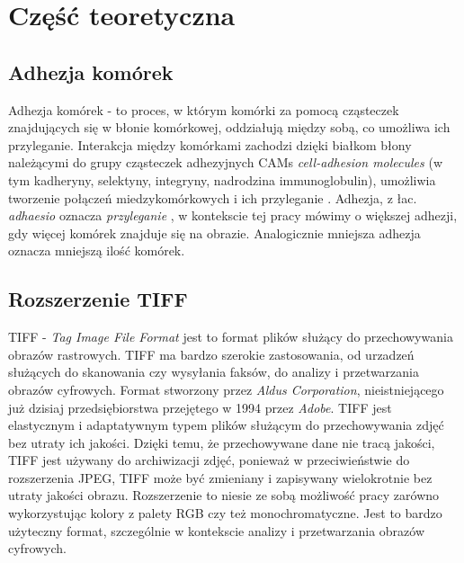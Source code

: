\documentclass{article}
\begin{document}
    \newpage
    \section{Część teoretyczna}
        \subsection{Adhezja komórek}
        {
            \label{sec:adhezja-komorek}
            \Large
            \justifying
            \quad
            Adhezja komórek - to proces, w którym komórki za pomocą cząsteczek znajdujących się w błonie komórkowej, oddziałują między sobą, co umożliwa ich przyleganie.
            Interakcja między komórkami zachodzi dzięki białkom błony należącymi do grupy cząsteczek adhezyjnych CAMs \textit{cell-adhesion molecules} (w tym kadheryny, selektyny, integryny, nadrodzina immunoglobulin), umożliwia tworzenie połączeń miedzykomórkowych i ich przyleganie
            \cite{Molecular Biology of the Cell. 4th edition}.
            Adhezja, z łac. \textit {adhaesio} oznacza \textit{przyleganie} \cite{adhezja}, w kontekscie tej pracy mówimy o większej adhezji, gdy więcej komórek znajduje się na obrazie.
            Analogicznie mniejsza adhezja oznacza mniejszą ilość komórek.
        }
        \subsection{Rozszerzenie TIFF}
        {
            \label{sec:rozszerzenie-tiff}
            \Large
            \justifying
            \quad
            TIFF - \textit{Tag Image File Format} jest to format plików służący do przechowywania obrazów rastrowych.
            TIFF ma bardzo szerokie zastosowania, od urzadzeń służących do skanowania czy wysyłania faksów, do analizy i przetwarzania obrazów cyfrowych.
            Format stworzony przez \textit{Aldus Corporation}, nieistniejącego już dzisiaj przedsiębiorstwa przejętego w 1994 przez \textit{Adobe}.
            TIFF jest elastycznym i adaptatywnym typem plików służącym do przechowywania zdjęć bez utraty ich jakości.
            Dzięki temu, że przechowywane dane nie tracą jakości, TIFF jest używany do archiwizacji zdjęć, ponieważ w przeciwieństwie do rozszerzenia JPEG,
            TIFF może być zmieniany i zapisywany wielokrotnie bez utraty jakości obrazu.
            Rozszerzenie to niesie ze sobą możliwość pracy zarówno wykorzystując kolory z palety RGB czy też monochromatyczne.
            Jest to bardzo użyteczny format, szczególnie w kontekscie analizy i przetwarzania obrazów cyfrowych. \cite{Encyclopedia of Graphics File Formats: The Complete Reference}
        }
\end{document}
